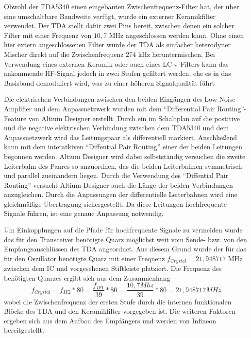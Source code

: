 Obwohl der TDA5340 einen eingebauten Zwischenfrequenz-Filter hat, der über eine umschaltbare Bandweite verfügt, wurde ein externer Keramikfilter verwendet. Der TDA stellt dafür zwei Pins bereit, zwischen denen ein solcher Filter mit einer Frequenz von  $10,7$ MHz angeschlossen werden kann. Ohne einen hier extern angeschlossenen Filter würde der TDA als einfacher heterodyner Mischer direkt auf die Zwischenfrequenz $274$ kHz heruntermischen. Bei Verwendung eines externen Keramik oder auch eines LC $\pi$-Filters kann das ankommende HF-Signal jedoch in zwei Stufen gefiltert werden, ehe es in das Basisband demoduliert wird, was zu einer höheren Signalqualität führt%

Die elektrischen Verbindungen zwischen den beiden Eingängen des Low Noise Amplifier und dem Anpassnetzwerk wurden mit dem \enquote{Differential Pair Routing}-Feature von Altium Designer erstellt. Durch ein im Schaltplan auf die postitive und die negative elektrischen Verbindung zwischen dem TDA5340 und dem Anpassnetzwerk wird das Leitungspaar als differentiell markiert. Anschließend kann mit dem interatkiven \enquote{Diffential Pair Routing} einer der beiden Leitungen begonnen werden. Altium Designer wird dabei selbstständig versuchen die zweite Leiterbahn des Paares so anzuordnen, das die beiden Leiterbahnen symmetrisch und parallel zueinandern liegen. %
Durch die Verwendung des \enquote{Diffential Pair Routing} versucht Altium Designer auch die Länge der beiden Verbindungen anzugleichen. Durch die Anpassungen der differentielle Leiterbahnen wird eine gleichmäßige Übertragung sichergestellt. Da diese Leitungen hochfrequente Signale führen, ist eine genaue Anpassung notwendig.




Um Einkopplungen auf die Pfade für hochfrequente Signale zu vermeiden wurde das für den Transceiver benötigte Quarz möglichst weit vom Sende- bzw. von den Empfangsanschlüssen des TDA angeordnet. Aus diesem Grund wurde der für das für den Oszillator benötigte Quarz mit einer Frequenz $f_{Crystal}=21,948717$ MHz zwischen dem \ac{IC} und vorgesehenen Stiftleiste platziert.  Die Frequenz des benötigten Quarzes ergibt sich aus dem  Zusammenhang
\begin{equation}\label{eq:fsys}
f_{Crystal} = f_{IF2} * 80 = \frac{f_{IF1}}{39} * 80  = \frac{10,7 Mhz}{39} * 80 = 21,948717 MHz
\end{equation}
wobei die Zwischenfrequenz der ersten Stufe durch die internen funktionalen Blöcke des TDA und den Keramikfilter vorgegeben ist. Die weiteren Faktoren ergeben sich aus dem Aufbau des Empfängers und werden von Infineon bereitgestellt\cite{TDA-UserManual}.


